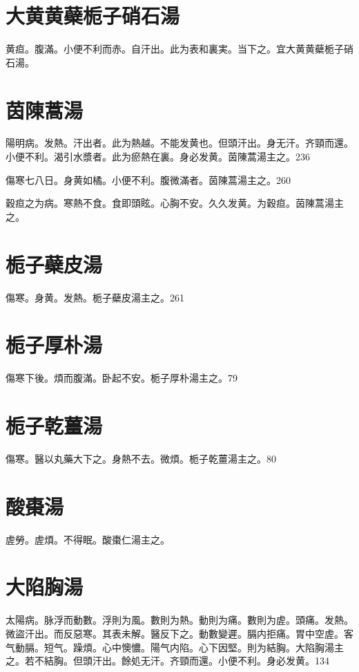 \documentclass[b5paper,twoside,zihao=-4,UTF8]{ctexbook}
\begin{document}
\section{大黄黄蘗栀子硝石湯}

黄疸。腹滿。小便不利而赤。自汗出。此为表和裏実。当下之。宜大黄{黄蘗栀子}硝石湯。

\section{茵陳蒿湯}

陽明病。发熱。汗出者。此为熱越。不能发黄也。但頭汗出。身无汗。齐頸而還。小便不利。渴引水漿者。此为瘀熱在裏。身必发黄。茵陳{蒿}湯主之。236

傷寒七八日。身黄如橘。小便不利。腹微滿者。茵陳{蒿}湯主之。260

穀疸之为病。寒熱不食。食即頭眩。心胸不安。久久发黄。为穀疸。茵陳蒿湯主之。

\section{栀子蘗皮湯}

傷寒。身黄。发熱。栀子蘗皮湯主之。261

\section{栀子厚朴湯}

傷寒下後。煩而腹滿。卧起不安。栀子厚朴湯主之。79

\section{栀子乾薑湯}

傷寒。醫以丸藥大下之。身熱不去。微煩。栀子乾薑湯主之。80

\section{酸棗湯}

虗勞。虗煩。不得眠。酸棗{仁}湯主之。

\section{大陷胸湯}

太陽病。脉浮而動數。浮則为風。數則为熱。動則为痛。數則为虗。頭痛。发熱。微盜汗出。而反惡寒。其表未解。醫反下之。動數變遲。膈内拒痛。胃中空虗。客气動膈。短气。躁煩。心中懊憹。陽气内陷。心下因堅。則为結胸。大陷胸湯主之。若不結胸。但頭汗出。餘処无汗。齐頸而還。小便不利。身必发黄。134
\end{document}
